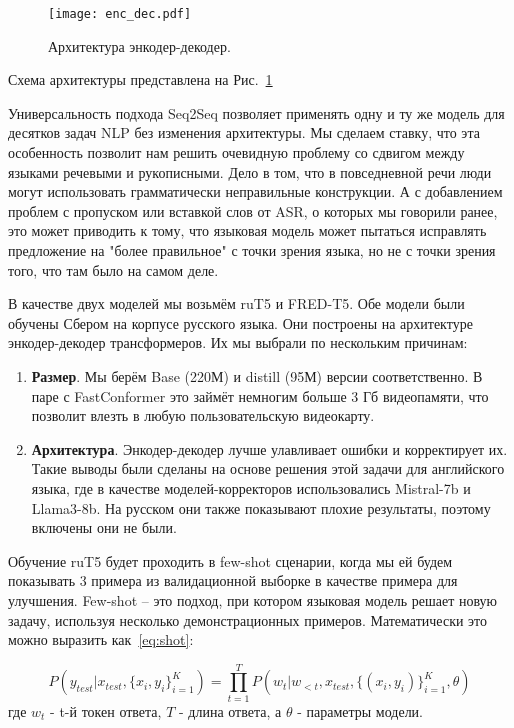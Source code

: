 \begin{figure}[!t]
  \centering
  \texttt{[image: enc\_dec.pdf]}
  \caption{Архитектура энкодер-декодер.}
  \label{fig:enc_dec}
\end{figure}

Схема архитектуры представлена на Рис.~\ref{fig:enc_dec}

Универсальность подхода Seq2Seq позволяет применять одну и ту же модель для десятков задач NLP без изменения архитектуры.
Мы сделаем ставку, что эта особенность позволит нам решить очевидную проблему со сдвигом между языками речевыми и рукописными.
Дело в том, что в повседневной речи люди могут использовать грамматически неправильные конструкции.
А с добавлением проблем с пропуском или вставкой слов от ASR, о которых мы говорили ранее, это может приводить к тому, что языковая модель может пытаться исправлять предложение на "более правильное" с точки зрения языка, но не с точки зрения того, что там было на самом деле.

В качестве двух моделей мы возьмём ruT5 и FRED-T5\cite{zmitrovich2023family}.
Обе модели были обучены Сбером на корпусе русского языка.
Они построены на архитектуре энкодер-декодер трансформеров.
Их мы выбрали по нескольким причинам:

\begin{enumerate}
  \item \textbf{Размер}.
  Мы берём Base (220М) и distill (95М) версии соответственно. 
  В паре с FastConformer это займёт немногим больше 3 Гб видеопамяти, что позволит влезть в любую пользовательскую видеокарту.
  \item \textbf{Архитектура}.
  Энкодер-декодер лучше улавливает ошибки и корректирует их.
  Такие выводы были сделаны на основе решения этой задачи для английского языка\cite{iudinenhancing}, где в качестве моделей-корректоров использовались Mistral-7b и Llama3-8b\cite{grattafiori2024llama}.
  На русском они также показывают плохие результаты, поэтому включены они не были.
\end{enumerate}

Обучение ruT5 будет проходить в few-shot сценарии, когда мы ей будем показывать 3 примера из валидационной выборке в качестве примера для улучшения.
Few-shot -- это подход, при котором языковая модель решает новую задачу, используя несколько демонстрационных примеров.
Математически это можно выразить как~\ref{eq:shot}:

\begin{equation}
  P(y_{test}|x_{test},\{x_i,y_i\}^K_{i=1}) = \prod_{t=1}^{T}P(w_t|w_{<t},x_{test},\{(x_i,y_i)\}^K_{i=1},\theta)
  \label{eq:shot}
\end{equation}
где $w_t$ - t-й токен ответа, $T$ - длина ответа, а $\theta$ - параметры модели.

